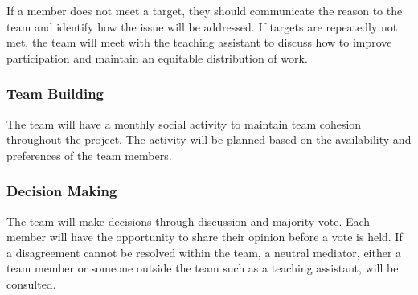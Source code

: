 \documentclass{article}
\begin{document}
If a member does not meet a target, they should communicate the reason to the team and identify
how the issue will be addressed. If targets are repeatedly not met, the team will meet with the
teaching assistant to discuss how to improve participation and maintain an equitable distribution of work.

\subsubsection*{Team Building}

The team will have a monthly social activity to maintain team cohesion throughout the project.
The activity will be planned based on the availability and preferences of the team members.

\subsubsection*{Decision Making}

The team will make decisions through discussion and majority vote. Each member will have the
opportunity to share their opinion before a vote is held. If a disagreement cannot be resolved
within the team, a neutral mediator, either a team member or someone outside the team such as
a teaching assistant, will be consulted.
\end{document}
